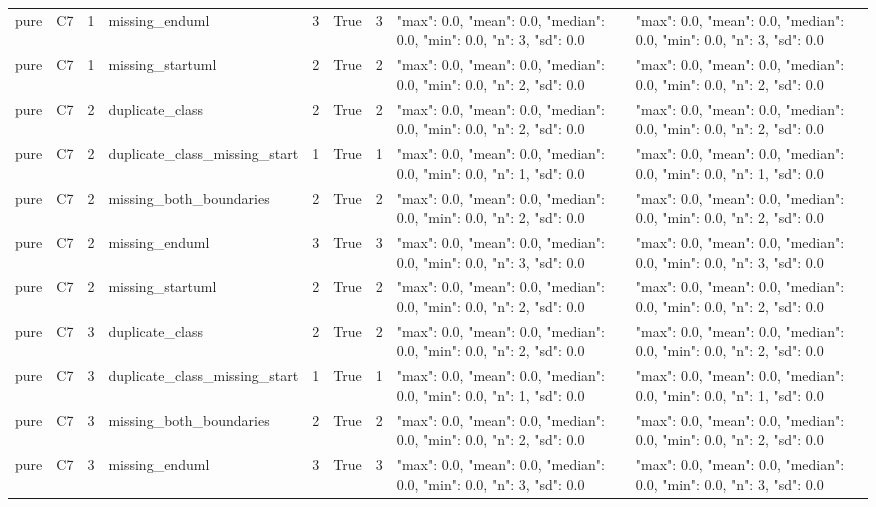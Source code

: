 \begin{tabular}{lllllllll}
pure & C7 & 1 & missing\_enduml & 3 & True & 3 & {"max": 0.0, "mean": 0.0, "median": 0.0, "min": 0.0, "n": 3, "sd": 0.0} & {"max": 0.0, "mean": 0.0, "median": 0.0, "min": 0.0, "n": 3, "sd": 0.0} \\
pure & C7 & 1 & missing\_startuml & 2 & True & 2 & {"max": 0.0, "mean": 0.0, "median": 0.0, "min": 0.0, "n": 2, "sd": 0.0} & {"max": 0.0, "mean": 0.0, "median": 0.0, "min": 0.0, "n": 2, "sd": 0.0} \\
pure & C7 & 2 & duplicate\_class & 2 & True & 2 & {"max": 0.0, "mean": 0.0, "median": 0.0, "min": 0.0, "n": 2, "sd": 0.0} & {"max": 0.0, "mean": 0.0, "median": 0.0, "min": 0.0, "n": 2, "sd": 0.0} \\
pure & C7 & 2 & duplicate\_class\_missing\_start & 1 & True & 1 & {"max": 0.0, "mean": 0.0, "median": 0.0, "min": 0.0, "n": 1, "sd": 0.0} & {"max": 0.0, "mean": 0.0, "median": 0.0, "min": 0.0, "n": 1, "sd": 0.0} \\
pure & C7 & 2 & missing\_both\_boundaries & 2 & True & 2 & {"max": 0.0, "mean": 0.0, "median": 0.0, "min": 0.0, "n": 2, "sd": 0.0} & {"max": 0.0, "mean": 0.0, "median": 0.0, "min": 0.0, "n": 2, "sd": 0.0} \\
pure & C7 & 2 & missing\_enduml & 3 & True & 3 & {"max": 0.0, "mean": 0.0, "median": 0.0, "min": 0.0, "n": 3, "sd": 0.0} & {"max": 0.0, "mean": 0.0, "median": 0.0, "min": 0.0, "n": 3, "sd": 0.0} \\
pure & C7 & 2 & missing\_startuml & 2 & True & 2 & {"max": 0.0, "mean": 0.0, "median": 0.0, "min": 0.0, "n": 2, "sd": 0.0} & {"max": 0.0, "mean": 0.0, "median": 0.0, "min": 0.0, "n": 2, "sd": 0.0} \\
pure & C7 & 3 & duplicate\_class & 2 & True & 2 & {"max": 0.0, "mean": 0.0, "median": 0.0, "min": 0.0, "n": 2, "sd": 0.0} & {"max": 0.0, "mean": 0.0, "median": 0.0, "min": 0.0, "n": 2, "sd": 0.0} \\
pure & C7 & 3 & duplicate\_class\_missing\_start & 1 & True & 1 & {"max": 0.0, "mean": 0.0, "median": 0.0, "min": 0.0, "n": 1, "sd": 0.0} & {"max": 0.0, "mean": 0.0, "median": 0.0, "min": 0.0, "n": 1, "sd": 0.0} \\
pure & C7 & 3 & missing\_both\_boundaries & 2 & True & 2 & {"max": 0.0, "mean": 0.0, "median": 0.0, "min": 0.0, "n": 2, "sd": 0.0} & {"max": 0.0, "mean": 0.0, "median": 0.0, "min": 0.0, "n": 2, "sd": 0.0} \\
pure & C7 & 3 & missing\_enduml & 3 & True & 3 & {"max": 0.0, "mean": 0.0, "median": 0.0, "min": 0.0, "n": 3, "sd": 0.0} & {"max": 0.0, "mean": 0.0, "median": 0.0, "min": 0.0, "n": 3, "sd": 0.0} \\

\end{tabular}

